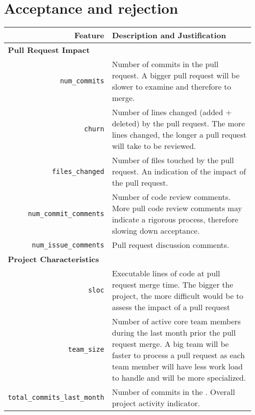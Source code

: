 \documentclass{sig-alternate}
\begin{document}
\section{Acceptance and rejection}
\label{sec:accrej}

\begin{table*}
  \begin{small}
  \centering
  \begin{tabular}{rp{25em}}
    \hline
    \bf{Feature} & \bf{Description and Justification}\\
    \hline
    \multicolumn{2}{l}{\bf{Pull Request Impact}}\\
    
    \texttt{num\_commits} & Number of commits in the pull request. A bigger
    pull request will be slower to examine and therefore to merge.\\
    
    \texttt{churn} & Number of lines changed (added + deleted) by the pull request. The more lines changed, the longer a pull request will take to be
    reviewed.\\

    \texttt{files\_changed} & Number of files touched by the pull request. An
    indication of the impact of the pull request.\\
    
    \texttt{num\_commit\_comments} & Number of code review comments. More pull
    code review comments may indicate a rigorous process, therefore slowing down
    acceptance.\\
    
    \texttt{num\_issue\_comments} & Pull request discussion comments.\\

    \multicolumn{2}{l}{\bf{Project Characteristics}}\\
    
    \texttt{sloc} & Executable lines of code at pull request merge time. The
    bigger the project, the more difficult would be to assess the impact of
    a pull request\\

    \texttt{team\_size} & Number of active core team members during the last
    month prior the pull request merge. A big team will be faster to process a
    pull request as each team member will have less work load to handle and
    will be more specialized.\\

    \texttt{total\_commits\_last\_month} & Number of commits in the . Overall project activity indicator.\\
    

\end{tabular}
\end{small}
\end{table*}
\end{document}
